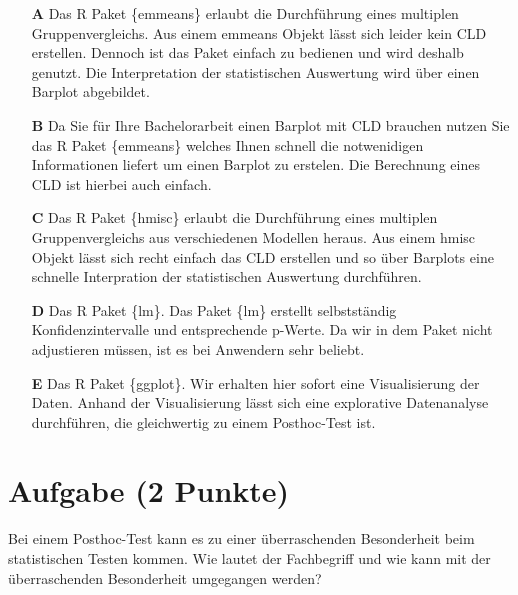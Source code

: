 \documentclass[a4paper, 9pt]{scrartcl}\usepackage[]{graphicx}\usepackage[]{xcolor}
\begin{document}
\begin{enumerate}
\item [\textbf{A} \msquare] Das R Paket \{emmeans\} erlaubt die Durchführung eines multiplen Gruppenvergleichs. Aus einem emmeans Objekt lässt sich leider kein CLD erstellen. Dennoch ist das Paket einfach zu bedienen und wird deshalb genutzt. Die Interpretation der statistischen Auswertung wird über einen Barplot abgebildet.
\item [\textbf{B} \msquare] Da Sie für Ihre Bachelorarbeit einen Barplot mit CLD brauchen nutzen Sie das R Paket \{emmeans\} welches Ihnen schnell die notwenidigen Informationen liefert um einen Barplot zu erstelen. Die Berechnung eines CLD ist hierbei auch einfach.
\item [\textbf{C} \msquare] Das R Paket \{hmisc\} erlaubt die Durchführung eines multiplen Gruppenvergleichs aus verschiedenen Modellen heraus. Aus einem hmisc Objekt lässt sich recht einfach das CLD erstellen und so über Barplots eine schnelle Interpration der statistischen Auswertung durchführen.
\item [\textbf{D} \msquare] Das R Paket \{lm\}. Das Paket \{lm\} erstellt selbstständig Konfidenzintervalle und entsprechende p-Werte. Da wir in dem Paket nicht adjustieren müssen, ist es bei Anwendern sehr beliebt.
\item [\textbf{E} \msquare] Das R Paket \{ggplot\}. Wir erhalten hier sofort eine Visualisierung der Daten. Anhand der Visualisierung lässt sich eine explorative Datenanalyse durchführen, die gleichwertig zu einem Posthoc-Test ist.
\end{enumerate}

\section{Aufgabe \hfill (2 Punkte)}



Bei einem Posthoc-Test kann es zu einer überraschenden Besonderheit beim statistischen Testen kommen. Wie lautet der Fachbegriff und wie kann mit der überraschenden Besonderheit umgegangen werden?
\end{document}
